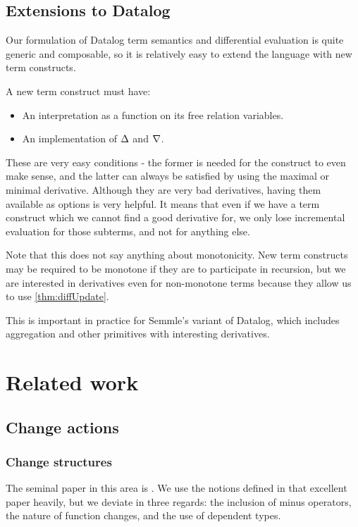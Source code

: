 \subsection{Extensions to Datalog}

Our formulation of Datalog term semantics and differential evaluation is quite
generic and composable, so it is relatively easy to extend the language with new
term constructs.

A new term construct must have:
\begin{itemize}
  \item An interpretation as a function on its free relation variables.
  \item An implementation of $\Delta$ and $\nabla$.
\end{itemize}

These are very easy conditions - the former is needed for the construct to even
make sense, and the latter can always be satisfied by using the maximal or
minimal derivative. Although they are very bad derivatives, having them
available as options is very helpful. It means that even if we have a term
construct which we cannot find a good derivative for, we only lose incremental
evaluation for those subterms, and not for anything else.

Note that this does not say anything about monotonicity. New term constructs may
be required to be monotone if they are to participate in recursion, but we are
interested in derivatives even for non-monotone terms because they allow us to
use \cref{thm:diffUpdate}.

This is important in practice for Semmle's variant of Datalog, which includes
aggregation and other primitives with interesting derivatives.

\section{Related work}

\subsection{Change actions}

\subsubsection{Change structures}
\label{sec:relatedChangeStructures}

The seminal paper in this area is \textcite{cai2014changes}. We use the notions
defined in that excellent paper heavily, but we deviate in three regards: the
inclusion of minus operators, the nature of function changes, and the use of
dependent types.


